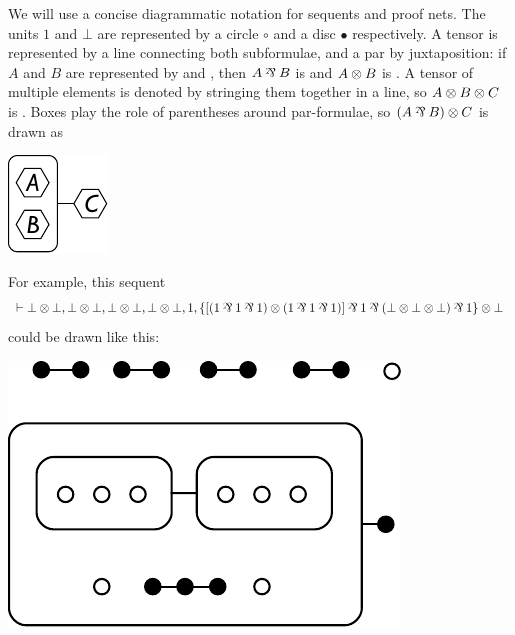 \documentclass[conference,onecolumn]{IEEEtran}
\begin{document}
We will use a concise diagrammatic notation for sequents and proof nets.
%
The units $1$ and $\bot$ are represented by a circle $\circ$ and a disc $\bullet$ respectively.
%
A tensor is represented by a line connecting both subformulae, and a par by juxtaposition: if $A$ and $B$ are represented by 
and ,
%
then $A\parr B$ is 
and $A\otimes B$ is .
%
A tensor of multiple elements is denoted by stringing them together in a line, so $A\otimes B\otimes C$ is
.
%
Boxes play the role of parentheses around par-formulae, so $(A\parr B)\tn C$ is drawn as \begin{center}{\includegraphics[scale=1]{hex-AparBtnC.pdf}}\end{center}

\noindent For example, this sequent
\[ \vdash \bot\tn\bot, \bot\tn\bot, \bot\tn\bot, \bot\tn\bot, 1, \{[(1\parr 1\parr 1)\tn(1\parr 1\parr 1)]\parr 1\parr (\bot\tn\bot\tn\bot)\parr 1\}\tn\bot \]
could be drawn like this:
\begin{center}\includegraphics[scale=0.75]{example-sequent.pdf}\end{center}
\end{document}
